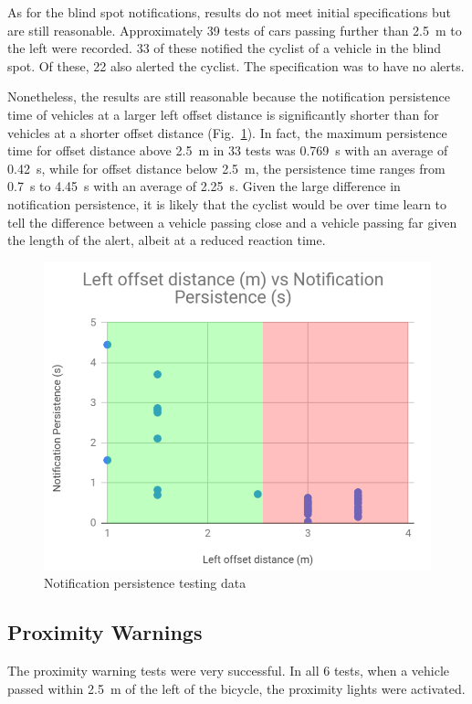 \documentclass[journal]{IEEEtran}
\begin{document}
As for the blind spot notifications, results do not meet initial specifications but are still reasonable. Approximately 39 tests of cars passing further than \SI{2.5}{\meter} to the left were recorded. 33 of these notified the cyclist of a vehicle in the blind spot. Of these, 22 also alerted the cyclist. The specification was to have no alerts.

Nonetheless, the results are still reasonable because the notification persistence time of vehicles at a larger left offset distance is significantly shorter than for vehicles at a shorter offset distance (Fig.~\ref{fig:bs1_pers}). In fact, the maximum persistence time for offset distance above \SI{2.5}{\meter} in 33 tests was \SI{0.769}{\s} with an average of \SI{0.42}{\s}, while for offset distance below \SI{2.5}{\meter}, the persistence time ranges from \SI{0.7}{\s} to \SI{4.45}{\s} with an average of \SI{2.25}{\s}. Given the large difference in notification persistence, it is likely that the cyclist would be over time learn to tell the difference between a vehicle passing close and a vehicle passing far given the length of the alert, albeit at a reduced reaction time.

\begin{figure}
    \centering
    \includegraphics[width=\columnwidth]{images/BS2_persistence.png}
    \caption{Notification persistence testing data}
    \label{fig:bs1_pers}
\end{figure}

\subsection{Proximity Warnings}
The proximity warning tests were very successful. In all 6 tests, when a vehicle passed within \SI{2.5}{\meter} of the left of the bicycle, the proximity lights were activated.
\end{document}
